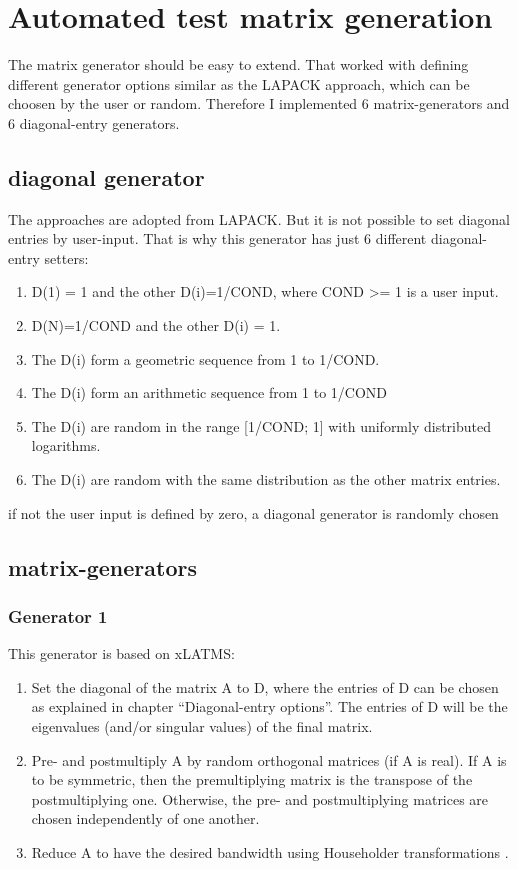 \documentclass[a4paper]{article}
\begin{document}
\section{Automated test matrix generation}

The matrix generator should be easy to extend.  
That worked with defining different generator options similar as the LAPACK approach, which can be choosen by the user or random.
Therefore I implemented 6 matrix-generators and 6 diagonal-entry generators.

\subsection{diagonal generator}
The approaches are adopted from LAPACK. But it is not possible to set diagonal entries by user-input. That is why this generator has just 6 different diagonal-entry setters:
\begin{enumerate}
	\item D(1) = 1 and the other D(i)=1/COND, where COND >= 1 is a user input.
	\item D(N)=1/COND and the other D(i) = 1. 
	\item The D(i) form a geometric sequence from 1 to 1/COND. 
	\item The D(i) form an arithmetic sequence from 1 to 1/COND
	\item The D(i) are random in the range [1/COND; 1] with uniformly distributed logarithms. 
	\item The D(i) are random with the same distribution as the other matrix entries.
\end{enumerate}
if not the user input is defined by zero, a diagonal generator is randomly chosen

\subsection{matrix-generators}

\subsubsection{Generator 1}
This generator is based on xLATMS: 

\begin{enumerate}
	\item Set the diagonal of the matrix A to D, where the entries of D can be chosen as explained in chapter “Diagonal-entry options”. The entries of D will be the eigenvalues (and/or singular values) of the final matrix.
	\item Pre- and postmultiply A by random orthogonal matrices (if A is real). If A is to be symmetric, then the premultiplying matrix is the transpose of the postmultiplying one. Otherwise, the pre- and postmultiplying matrices are chosen independently of one another.
	\item Reduce A to have the desired bandwidth using Householder transformations \cite{numerikskript}.
\end{enumerate}
\end{document}
